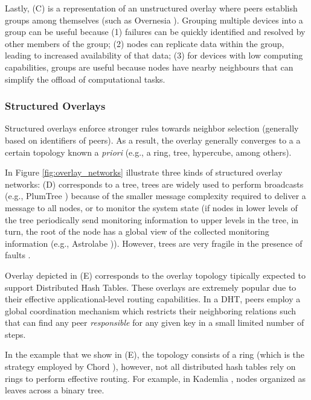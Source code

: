 Lastly, (C) is a representation of an unstructured overlay where peers establish groups among themselves (such as Overnesia \cite{leitao2014overnesia}). Grouping multiple devices into a group can be useful because (1) failures can be quickly identified and resolved by other members of the group; (2) nodes can replicate data within the group, leading to increased availability of that data; (3) for devices with low computing capabilities, groups are useful because nodes have nearby neighbours that can simplify the offload of computational tasks. 

\subsubsection*{Structured Overlays}

Structured overlays enforce stronger rules towards neighbor selection (generally based on identifiers of peers). As a result, the overlay generally converges to a a certain topology known a \textit{priori} (e.g., a ring, tree, hypercube, among others). 

In Figure \ref{fig:overlay_networks} illustrate three kinds of structured overlay networks: (D) corresponds to a tree, trees are widely used to perform broadcasts (e.g., PlumTree \cite{plumTree}) because of the smaller message complexity required to deliver a message to all nodes, or to monitor the system state (if nodes in lower levels of the tree periodically send monitoring information to upper levels in the tree, in turn, the root of the node has a global view of the collected monitoring information (e.g., Astrolabe \cite{Renesse2003})). However, trees are very fragile in the presence of faults \cite{plumTree}.

Overlay depicted in (E) corresponds to the overlay topology tipically expected to support Distributed Hash Tables. These overlays are extremely popular due to their effective applicational-level routing capabilities. In a DHT, peers employ a global coordination mechanism which restricts their neighboring relations such that can find any peer \textit{responsible} for any given key in a small limited number of steps.

In the example that we show in (E), the topology consists of a ring (which is the strategy employed by Chord \cite{stoica2003chord}), however, not all distributed hash tables rely on rings to perform effective routing. For example, in Kademlia \cite{maymounkov2002kademlia}, nodes organized as leaves across a binary tree.

